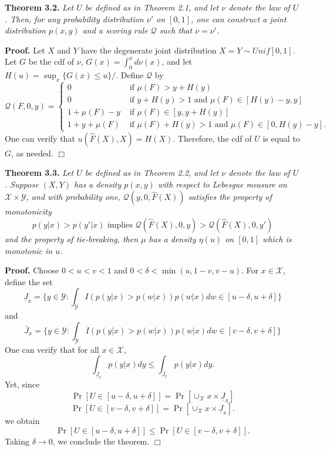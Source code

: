 \documentclass[12pt]{article}
\begin{document}
\noindent\textbf{Theorem 3.2.} \emph{ Let $U$ be defined as in Theorem
  2.1, and let $\nu$ denote the law of $U$.  Then, for any probability
  distribution $\nu'$ on $[0,1]$, one can construct a joint
  distribution $p(x, y)$ and a scoring rule $\mathcal{Q}$ such that 
  $\nu = \nu'$.
}

\noindent\textbf{Proof.}  
Let $X$ and $Y$ have the degenerate joint distribution $X= Y \sim Unif[0, 1]$.
Let $G$ be the cdf of $\nu$, $G(x) = \int_0^x d\nu(x)$, and let $H(u) = \sup_x \{G(x) \leq u\}/$.
Define $\mathcal{Q}$ by
\[
\mathcal{Q}(F, 0, y) = \begin{cases}
0 &\text{ if }\mu(F) > y + H(y)\\
0 & \text{ if }y + H(y) > 1 \text{ and }\mu(F) \in [H(y) - y, y]\\
1 + \mu(F) - y &\text{ if } \mu(F) \in [y, y + H(y)]\\
1 + y + \mu(F) &\text{ if }\mu(F) + H(y) > 1 \text{ and }\mu(F) \in [0, H(y) - y]. 
\end{cases}
\]
One can verify that $u(\hat{F}(X), X) = H(X).$  Therefore, the cdf of $U$ is equal to $G$, as needed. $\Box$

\noindent\textbf{Theorem 3.3.} \emph{ Let $U$ be defined as in Theorem
  2.2, and let $\nu$ denote the law of $U$.  Suppose $(X, Y)$ has a density $p(x, y)$ with respect to 
  Lebesgue measure on $\mathcal{X} \times \mathcal{Y}$,
  and with probability one, $\mathcal{Q}(y, 0, \hat{F}(X))$ satisfies the property of monotonicity
  \[
  p(y|x) > p(y'|x) \text{ implies } \mathcal{Q}(\hat{F}(X), 0, y) > \mathcal{Q}(\hat{F}(X), 0, y')
  \]
  and the property of tie-breaking, %
  then $\mu$ has a density $\eta(u)$ on $[0, 1]$ which is monotonic in $u$.
}

\noindent\textbf{Proof.}
Choose $0 < u < v < 1$ and $0 < \delta < \min(u, 1-v, v-u)$.
For $x \in \mathcal{X}$, define the set 
\[
\underline{J}_x = \{y \in \mathcal{Y}: \int_\mathcal{Y} I(p(y|x) > p(w|x))p(w|x) dw \in [u - \delta, u + \delta]\}
\]
and
\[
\bar{J}_x = \{y \in \mathcal{Y}: \int_\mathcal{Y} I(p(y|x) > p(w|x))p(w|x) dw \in [v - \delta, v + \delta]\}
\]
One can verify that for all $x \in \mathcal{X}$,
\[
\int_{\underline{J}_x} p(y|x) dy \leq \int_{\bar{J}_x} p(y|x) dy.
\]
Yet, since
\[
\Pr[U \in [u-\delta, u + \delta]] = \Pr[\cup_\mathcal{X} x \times \underline{J}_x]
\]
\[
\Pr[U \in [v-\delta, v + \delta]] = \Pr[\cup_\mathcal{X} x \times \underline{J}_x].
\]
we obtain
\[
\Pr[U \in [u-\delta, u + \delta]] \leq \Pr[U \in [v - \delta, v + \delta]].
\]
Taking $\delta \to 0$, we conclude the theorem. $\Box$
\end{document}
